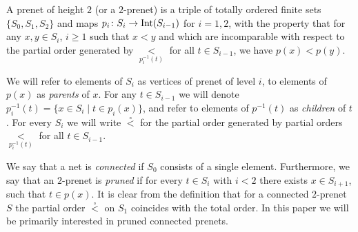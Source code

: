 \documentclass[letterpaper,12pt,leqno]{article}
\numberwithin{equation}{theorem}
\def\Int{\mathrm{Int}}
\def\lesub{\mathop{<}\limits}
\def\pless{\lesub^\circ}
\begin{document}
\begin{definition}
\label{def_prenet}
A prenet of height $2$ (or a $2$-prenet) is a triple of totally ordered finite sets $\{S_0, S_1, S_2\}$ and maps $p_i \from S_i \to \Int(S_{i-1})$ for $i = 1, 2$,
with the property that for any $x, y \in S_i$, $i \ge 1$ such that $x < y$ and which are incomparable with respect to the partial order generated by $\lesub_{p_i^{-1}(t)}$ for all $t \in S_{i-1}$, we have $p(x) < p(y)$.
\end{definition}

We will refer to elements of $S_i$ as vertices of prenet of level $i$, to elements of $p(x)$ as {\em parents} of $x$.
For any $t \in S_{i-1}$ we will denote $p_i^{-1}(t) = \{x \in S_i \mid t \in p_i(x)\}$, and refer to elements of $p^{-1}(t)$ as {\em children} of $t$.
For every $S_i$ we will write $\pless$ for the partial order generated by partial orders $\lesub_{p_i^{-1}(t)}$ for all $t \in S_{i-1}$.

We say that a net is {\em connected} if $S_0$ consists of a single element. Furthermore, we say that an $2$-prenet is {\em pruned} if for every $t \in S_i$ with $i < 2$
there exists $x \in S_{i+1}$, such that $t \in p(x)$. It is clear from the definition that for a connected $2$-prenet $S$ the partial order $\pless$ on $S_1$ coincides with the total order.
In this paper we will be primarily interested in pruned connected prenets.
\end{document}
